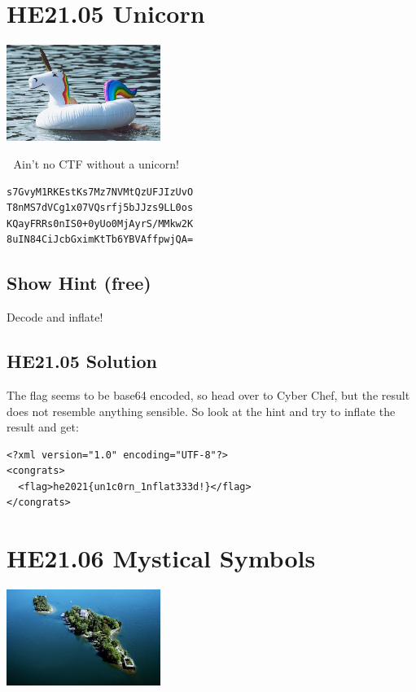 \documentclass[english,a4paper,nols,noindent]{tufte-handout}
\begin{document}
\hypertarget{he21.05}{%
\section{HE21.05 Unicorn}\label{he21.05}}
\begin{marginfigure}
    \includegraphics[width=50mm]{images/challenge5.jpg}
\end{marginfigure}

\noindent 🦄 Ain't no CTF without a unicorn! 🦄

\begin{verbatim}
s7GvyM1RKEstKs7Mz7NVMtQzUFJIzUvO  
T8nMS7dVCg1x07VQsrfj5bJJzs9LL0os  
KQayFRRs0nIS0+0yUo0MjAyrS/MMkw2K  
8uIN84CiJcbGximKtTb6YBVAffpwjQA=  
\end{verbatim}

\subsection{Show Hint (free)}
Decode and inflate!

\hypertarget{he21.05-solution}{%
\subsection{HE21.05 Solution}\label{he21.05-solution}}

The flag seems to be base64 encoded, so head over to Cyber Chef, but
the result does not resemble anything sensible. So look at the hint
and try to inflate the result and get:

\begin{verbatim}
<?xml version="1.0" encoding="UTF-8"?>
<congrats>
  <flag>he2021{un1c0rn_1nflat333d!}</flag>
</congrats>
\end{verbatim}

\hypertarget{he21.06}{%
  \section{HE21.06 Mystical Symbols}
  \label{he21.06}}
\begin{marginfigure}
    \includegraphics[width=50mm]{images/challenge6.jpg}
\end{marginfigure}
\end{document}
